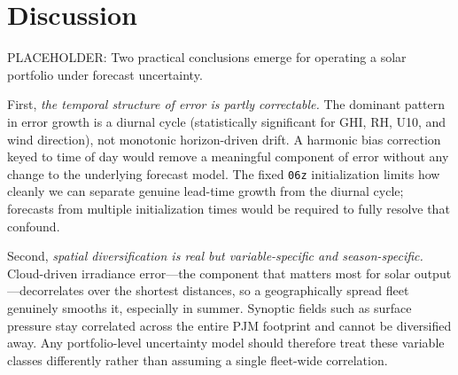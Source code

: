 \section{Discussion}\label{sec:discussion}

PLACEHOLDER: Two practical conclusions emerge for operating a solar portfolio under forecast uncertainty.

First, \emph{the temporal structure of error is partly correctable.} The dominant pattern in
error growth is a diurnal cycle (statistically significant for GHI, RH, U10, and wind direction),
not monotonic horizon-driven drift. A harmonic bias correction keyed to time of day would remove
a meaningful component of error without any change to the underlying forecast model. The fixed
\texttt{06z} initialization limits how cleanly we can separate genuine lead-time growth from the
diurnal cycle; forecasts from multiple initialization times would be required to fully resolve
that confound.

Second, \emph{spatial diversification is real but variable-specific and season-specific.}
Cloud-driven irradiance error---the component that matters most for solar output---decorrelates
over the shortest distances, so a geographically spread fleet genuinely smooths it, especially in
summer. Synoptic fields such as surface pressure stay correlated across the entire PJM footprint
and cannot be diversified away. Any portfolio-level uncertainty model should therefore treat these
variable classes differently rather than assuming a single fleet-wide correlation.
